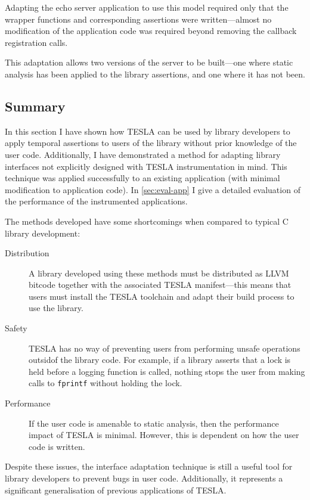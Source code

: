 Adapting the echo server application to use this model required only that the
wrapper functions and corresponding assertions were written---almost no
modification of the application code was required beyond removing the callback
registration calls.

This adaptation allows two versions of the server to be built---one where static
analysis has been applied to the library assertions, and one where it has not
been.

\subsection{Summary}

In this section I have shown how TESLA can be used by library developers to
apply temporal assertions to users of the library without prior knowledge of the
user code. Additionally, I have demonstrated a method for adapting library
interfaces not explicitly designed with TESLA instrumentation in mind. This
technique was applied successfully to an existing application (with minimal
modification to application code). In \autoref{sec:eval-app} I give a detailed
evaluation of the performance of the instrumented applications.

The methods developed have some shortcomings when compared to typical C library
development:
\begin{description}
  \item[Distribution] A library developed using these methods must be
    distributed as LLVM bitcode together with the associated TESLA
    manifest---this means that users must install the TESLA toolchain and adapt
    their build process to use the library.

  \item[Safety] TESLA has no way of preventing users from performing unsafe
    operations outsidof the library code. For example, if a library asserts that
    a lock is held before a logging function is called, nothing stops the user
    from making calls to \texttt{fprintf} without holding the lock.

  \item[Performance] If the user code is amenable to static analysis, then the
    performance impact of TESLA is minimal. However, this is dependent on how
    the user code is written.
\end{description}

Despite these issues, the interface adaptation technique is still a useful tool
for library developers to prevent bugs in user code. Additionally, it represents
a significant generalisation of previous applications of TESLA.
